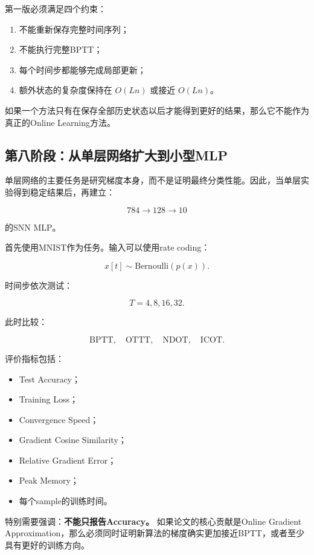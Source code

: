 \documentclass[journal,12pt,onecolumn]{IEEEtran}
\begin{document}
第一版必须满足四个约束：

\begin{enumerate}
    \item 不能重新保存完整时间序列；
    \item 不能执行完整BPTT；
    \item 每个时间步都能够完成局部更新；
    \item 额外状态的复杂度保持在 \(O(Ln)\) 或接近 \(O(Ln)\)。
\end{enumerate}

如果一个方法只有在保存全部历史状态以后才能得到更好的结果，那么它不能作为真正的Online Learning方法。


\subsection{第八阶段：从单层网络扩大到小型MLP}

单层网络的主要任务是研究梯度本身，而不是证明最终分类性能。因此，当单层实验得到稳定结果后，再建立：

\[
784\rightarrow128\rightarrow10
\]

的SNN MLP。

首先使用MNIST作为任务。输入可以使用rate coding：

\[
x[t]\sim\mathrm{Bernoulli}(p(x)).
\]

时间步依次测试：

\[
T=4,8,16,32.
\]

此时比较：

\[
\text{BPTT},
\quad
\text{OTTT},
\quad
\text{NDOT},
\quad
\text{ICOT}.
\]

评价指标包括：

\begin{itemize}
    \item Test Accuracy；
    \item Training Loss；
    \item Convergence Speed；
    \item Gradient Cosine Similarity；
    \item Relative Gradient Error；
    \item Peak Memory；
    \item 每个sample的训练时间。
\end{itemize}

特别需要强调：\textbf{不能只报告Accuracy。} 如果论文的核心贡献是Online Gradient Approximation，那么必须同时证明新算法的梯度确实更加接近BPTT，或者至少具有更好的训练方向。
\end{document}
